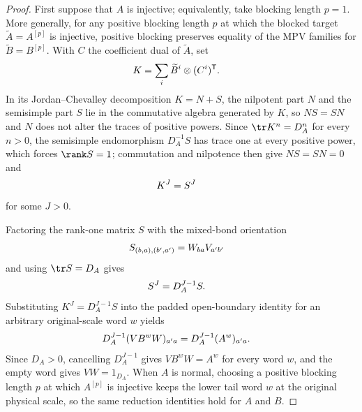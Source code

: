 \begin{proof}
    \leanok
    First suppose that $A$ is injective; equivalently, take blocking length
    $p=1$.  More generally, for any positive blocking length $p$ at which the
    blocked target $\widetilde A=A^{[p]}$ is injective, positive blocking
    preserves equality of the MPV families for $\widetilde B=B^{[p]}$.  With
    $C$ the coefficient dual of $\widetilde A$, set
    \begin{align}
        K
         & =\sum_i \widetilde B^i\otimes(C^i)^{\mathsf T}.
        \notag
    \end{align}
    In its Jordan--Chevalley decomposition $K=N+S$, the nilpotent part $N$ and
    the semisimple part $S$ lie in the commutative algebra generated by $K$,
    so $NS=SN$ and $N$ does not alter the traces of positive powers.  Since
    $\tr K^n=D_A^n$ for every $n>0$, the semisimple endomorphism $D_A^{-1}S$
    has trace one at every positive power, which forces $\rank S=1$;
    commutation and nilpotence then give $NS=SN=0$ and
    \begin{align}
        K^J
         & =S^J
        \notag
    \end{align}
    for some $J>0$.

    Factoring the rank-one matrix $S$ with the mixed-bond orientation
    \begin{align}
        S_{(b,a),(b',a')}
         & =W_{ba}V_{a'b'}
        \notag
    \end{align}
    and using $\tr S=D_A$ gives
    \begin{align}
        S^J
         & =D_A^{J-1}S.
        \notag
    \end{align}
    Substituting $K^J=D_A^{J-1}S$ into the padded open-boundary identity for
    an arbitrary original-scale word $w$ yields
    \begin{align}
        D_A^{J-1}(VB^wW)_{a'a}
         & =D_A^{J-1}(A^w)_{a'a}.
        \notag
    \end{align}
    Since $D_A>0$, cancelling $D_A^{J-1}$ gives $VB^wW=A^w$ for every word
    $w$, and the empty word gives $VW=1_{D_A}$.  When $A$ is normal, choosing
    a positive blocking length $p$ at which $A^{[p]}$ is injective keeps the
    lower tail word $w$ at the original physical scale, so the same reduction
    identities hold for $A$ and $B$.
\end{proof}

